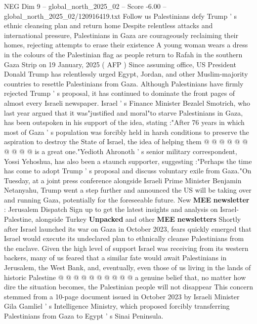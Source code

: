 \begin{textsample}{NEG Dim 9 – global\_north\_2025\_02 – Score -6.00 – global\_north\_2025\_02/120916419.txt}  \label{ex:f9_neg_013}
Follow us Palestinians defy Trump ' s ethnic cleansing plan and return home Despite relentless attacks and international pressure, Palestinians in Gaza are courageously reclaiming their homes, rejecting attempts to erase their existence A young woman wears a dress in the colours of the Palestinian flag as people return to Rafah in the southern Gaza Strip on 19 January, 2025 ( AFP ) Since assuming office, US President Donald Trump has relentlessly urged Egypt, Jordan, and other Muslim-majority countries to resettle Palestinians from Gaza.
Although Palestinians have firmly rejected Trump ' s proposal, it has continued to dominate the front pages of almost every Israeli newspaper.
Israel ' s Finance Minister Bezalel Smotrich, who last year argued that it was"justified and moral"to starve Palestinians in Gaza, has been outspoken in his support of the idea, stating :"After 76 years in which most of Gaza ' s population was forcibly held in harsh conditions to preserve the aspiration to destroy the State of Israel, the idea of helping them @ @ @ @ @ @ @ @ @ @ is a great one."Yedioth Ahronoth ' s senior military correspondent, Yossi Yehoshua, has also been a staunch supporter, suggesting :"Perhaps the time has come to adopt Trump ' s proposal and discuss voluntary exile from Gaza."On Tuesday, at a joint press conference alongside Israeli Prime Minister Benjamin Netanyahu, Trump went a step further and announced the US will be taking over and running Gaza, potentially for the foreseeable future.
New \textbf{MEE} \textbf{newsletter} : Jerusalem Dispatch Sign up to get the latest insights and analysis on Israel-Palestine, alongside Turkey \textbf{Unpacked} and other \textbf{MEE} \textbf{newsletters} Shortly after Israel launched its war on Gaza in October 2023, fears quickly emerged that Israel would execute its undeclared plan to ethnically cleanse Palestinians from the enclave.
Given the high level of support Israel was receiving from its western backers, many of us feared that a similar fate would await Palestinians in Jerusalem, the West Bank, and, eventually, even those of us living in the lands of historic Palestine @ @ @ @ @ @ @ @ @ @ a genuine belief that, no matter how dire the situation becomes, the Palestinian people will not disappear This concern stemmed from a 10-page document issued in October 2023 by Israeli Minister Gila Gamliel ' s Intelligence Ministry, which proposed forcibly transferring Palestinians from Gaza to Egypt ' s Sinai Peninsula.

\end{textsample}
